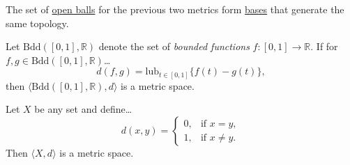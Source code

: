 \noindent The set of \hyperref[metricopenball]{open balls} for the previous two metrics form \hyperref[basis]{bases} that generate the same topology.

\label{bddmetric}

Let $\textrm{Bdd}([0,1],\mathbb{R})$ denote the set of \emph{bounded functions} $f : [0,1] \rightarrow \mathbb{R}$. If for $f,g \in \textrm{Bdd}([0,1],\mathbb{R})$\dots
$$d(f,g) = \textrm{lub}_{t \in [0,1]}\{f(t) - g(t)\},$$
then $\langle \textrm{Bdd}([0,1],\mathbb{R}),d \rangle$ is a metric space.

\label{discretemetric}

Let $X$ be any set and define\dots
\[
	d(x,y) = \begin{cases}
				0, & \textrm{if } x = y,\\
				1, & \textrm{if } x \neq y.
			 \end{cases}
\]
Then $\langle X,d \rangle$ is a metric space.